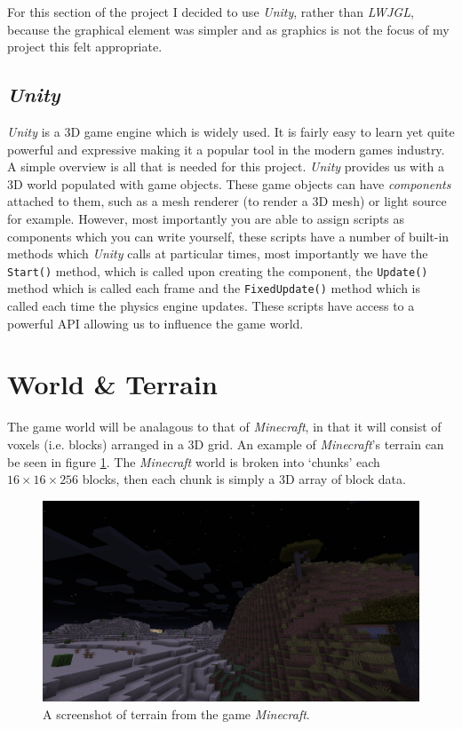 \documentclass[12pt,notitlepage,a4paper]{report}
\newcommand{\unity}{\emph{Unity}}
\begin{document}
	For this section of the project I decided to use \unity, rather than \emph{LWJGL}, because the graphical element was simpler and as graphics is not the focus of my project this felt appropriate.
	
	\subsection{\unity}
	\unity{} is a 3D game engine which is widely used. It is fairly easy to learn yet quite powerful and expressive making it a popular tool in the modern games industry. A simple overview is all that is needed for this project. \unity{} provides us with a 3D world populated with game objects. These game objects can have \emph{components} attached to them, such as a mesh renderer (to render a 3D mesh) or light source for example. However, most importantly you are able to assign scripts as components which you can write yourself, these scripts have a number of built-in methods which \unity{} calls at particular times, most importantly we have the {\tt Start()} method, which is called upon creating the component, the {\tt Update()} method which is called each frame and the {\tt FixedUpdate()} method which is called each time the physics engine updates. These scripts have access to a powerful API allowing us to influence the game world.
	
	\section{World \& Terrain}
	The game world will be analagous to that of \emph{Minecraft}, in that it will consist of voxels (i.e. blocks) arranged in a 3D grid. An example of \emph{Minecraft}'s terrain can be seen in figure \ref{fig:minecraft}. The \emph{Minecraft} world is broken into `chunks' each $16\times16\times256$ blocks, then each chunk is simply a 3D array of block data.
	\begin{figure}
		\includegraphics[width=\textwidth]{minecraft.png}
		\caption{A screenshot of terrain from the game \emph{Minecraft}.}
		\label{fig:minecraft}
	\end{figure}
\end{document}
